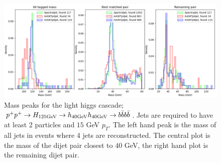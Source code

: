 \begin{figure}[htp]
    \includegraphics[width=1.\textwidth]{graphics/show2_40.png}
    \caption{Mass peaks for the light higgs cascade;
    \(p^+ p^+ \rightarrow H_{125\text{GeV}} \rightarrow h_{40\text{GeV}} h_{40\text{GeV}} \rightarrow b \bar{b} b \bar{b}\).
        Jets are required to have at least 2 particles and \(15\) GeV \(p_T\).
        The left hand peak is the mass of all jets in events where 4 jets are reconstructed.
        The central plot is the mass of the dijet pair closest to \(40\) GeV,
        the right hand plot is the remaining dijet pair.
    }
\end{figure}    

